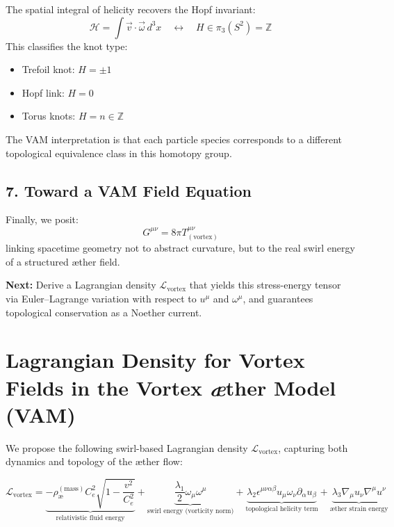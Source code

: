 \documentclass[twocolumn,aps,pre,floatfix,nofootinbib]{revtex4-2}
\begin{document}
    The spatial integral of helicity recovers the Hopf invariant:
    \begin{equation}
        \mathcal{H} = \int \vec{v} \cdot \vec{\omega} \, d^3x \quad \leftrightarrow \quad H \in \pi_3(S^2) = \mathbb{Z}
    \end{equation}
    This classifies the knot type:
    \begin{itemize}
        \item Trefoil knot: \( H = \pm 1 \)
        \item Hopf link: \( H = 0 \)
        \item Torus knots: \( H = n \in \mathbb{Z} \)
    \end{itemize}
    The VAM interpretation is that each particle species corresponds to a different topological equivalence class in this homotopy group.

    \subsection*{7. Toward a VAM Field Equation}

    Finally, we posit:
    \begin{equation}
        G^{\mu\nu} = 8\pi T^{\mu\nu}_{(\text{vortex})}
    \end{equation}
    linking spacetime geometry not to abstract curvature, but to the real swirl energy of a structured æther field.

    \textbf{Next:} Derive a Lagrangian density \( \mathcal{L}_{\text{vortex}} \) that yields this stress-energy tensor via Euler–Lagrange variation with respect to \( u^\mu \) and \( \omega^\mu \), and guarantees topological conservation as a Noether current.


    \section*{Lagrangian Density for Vortex Fields in the Vortex \textit{\ae}ther Model (VAM)}

    We propose the following swirl-based Lagrangian density \( \mathcal{L}_{\text{vortex}} \), capturing both dynamics and topology of the æther flow:

    \[
        \boxed{
            \mathcal{L}_{\text{vortex}} =
            \underbrace{-\rho_{\text{\ae}}^{(\text{mass})} C_e^2 \sqrt{1 - \frac{v^2}{C_e^2}}}_{\text{relativistic fluid energy}}
            +
            \underbrace{\frac{\lambda_1}{2} \omega_\mu \omega^\mu}_{\text{swirl energy (vorticity norm)}}
            +
            \underbrace{\lambda_2 \epsilon^{\mu\nu\alpha\beta} u_\mu \omega_\nu \partial_\alpha u_\beta}_{\text{topological helicity term}}
            +
            \underbrace{\lambda_3 \nabla_\mu u_\nu \nabla^\mu u^\nu}_{\text{æther strain energy}}
        }
    \]
\end{document}
